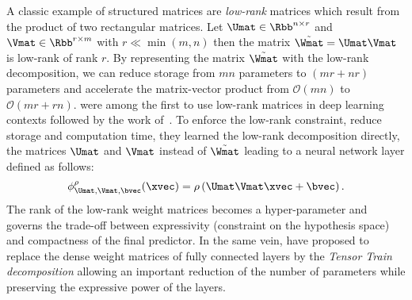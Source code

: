 \drawstar

A classic example of structured matrices are \emph{low-rank} matrices which result from the product of two rectangular matrices.
Let $\Umat \in \Rbb^{n \times r}$ and $\Vmat \in \Rbb^{r \times m}$ with $r \ll \min(m, n)$ then the matrix $\tilde{\Wmat} = \Umat \Vmat$ is low-rank of rank $r$.  
By representing the matrix $\tilde{\Wmat}$ with the low-rank decomposition, we can reduce storage from $mn$ parameters to $(mr + nr)$ parameters and accelerate the matrix-vector product from $\mathcal{O}(mn)$ to $\mathcal{O}(mr + rn)$.
\citet{sainath2013lowrank} were among the first to use low-rank matrices in deep learning contexts followed by the work of~\citet{jaderberg2014speeding,yu2017compressing}.
To enforce the low-rank constraint, reduce storage and computation time, they learned the low-rank decomposition directly, \ie the matrices $\Umat$ and $\Vmat$ instead of $\tilde{\Wmat}$ leading to a neural network layer defined as follows:
\begin{equation}
  \phi^\rho_{\Umat, \Vmat, \bvec} (\xvec) = \rho\left( \Umat \Vmat \xvec + \bvec \right) .
\end{equation}
The rank of the low-rank weight matrices becomes a hyper-parameter and governs the trade-off between expressivity (\ie constraint on the hypothesis space) and compactness of the final predictor. 
In the same vein, \citet{novikov2015tensorizing} have proposed to replace the dense weight matrices of fully connected layers by the \emph{Tensor Train decomposition} allowing an important reduction of the number of parameters while preserving the expressive power of the layers.


%
%

